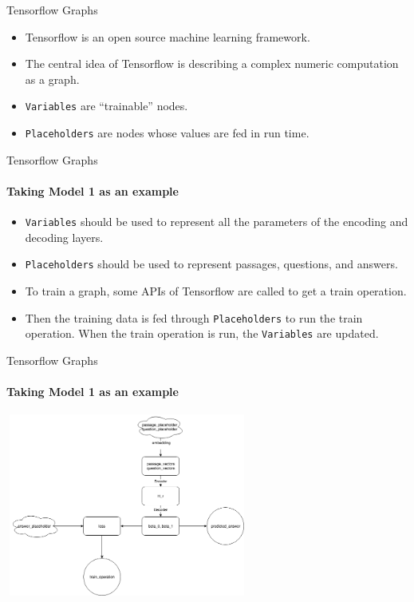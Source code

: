 \documentclass{beamer}
\begin{document}
\begin{frame}{Tensorflow Graphs}
    \begin{itemize}
        \item Tensorflow is an open source machine learning framework.
        \item The central idea of Tensorflow is describing a complex numeric computation as a graph.
        \item {\tt Variables} are ``trainable'' nodes.
        \item {\tt Placeholders} are nodes whose values are fed in run time.
    \end{itemize}
\end{frame}

\begin{frame}{Tensorflow Graphs}\framesubtitle{Taking Model 1 as an example}
     \begin{itemize}
         \item {\tt Variables} should be used to represent all the parameters of the encoding and decoding layers.
         \item {\tt Placeholders} should be used to represent passages, questions, and answers.
         \item To train a graph, some APIs of Tensorflow are called to get a train operation.
         \item Then the training data is fed through {\tt Placeholders} to run the train operation. When the train operation is run, the {\tt Variables} are updated.
     \end{itemize}
\end{frame}

\begin{frame}{Tensorflow Graphs}\framesubtitle{Taking Model 1 as an example}
    \begin{center}
        \includegraphics[width=8cm, height=6cm]{figures/tf_graph.png}
    \end{center}
\end{frame}
\end{document}
